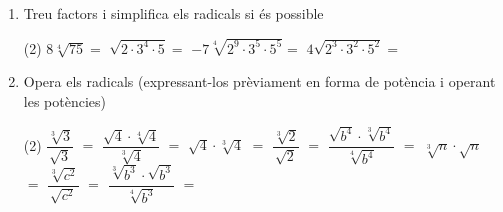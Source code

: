 \documentclass[a4paper]{article}
\begin{document}
\begin{enumerate}[resume]
  
      \item Treu factors i simplifica els radicals si és possible
      \begin{tasks}(2)
        \task $8  \sqrt[4]{75}={}$
        \task $ \sqrt{2 \cdot 3^{4} \cdot 5}={}$
        \task $-7  \sqrt[4]{2^{9} \cdot 3^{5} \cdot 5^{5}}={}$
        \task $4  \sqrt{2^{3} \cdot 3^{2} \cdot 5^{2}}={}$
      \end{tasks}
      \item Opera els radicals (expressant-los prèviament en forma de potència i operant les potències)
      \begin{tasks}(2)
        \task $\dfrac{ \sqrt[3]{3} }{  \sqrt{3}}$ $={}$
        \task $\dfrac{ \sqrt{4} \cdot  \sqrt[4]{4}}{ \sqrt[3]{4}}$ $={}$
        \task $ \sqrt{4} \cdot  \sqrt[3]{4}$ $={}$
        \task $\dfrac{ \sqrt[3]{2} }{  \sqrt{2}}$ $={}$
        \task $\dfrac{ \sqrt{b^{4}} \cdot  \sqrt[3]{b^{4}}}{ \sqrt[4]{b^{4}}}$ $={}$
        \task $ \sqrt[3]{n} \cdot  \sqrt{n}$ $={}$
        \task $\dfrac{ \sqrt[3]{c^{2}} }{  \sqrt{c^{2}}}$ $={}$
        \task $\dfrac{ \sqrt[3]{b^{3}} \cdot  \sqrt{b^{3}}}{ \sqrt[4]{b^{3}}}$ $={}$
      \end{tasks}
       \end{enumerate}
  
\end{document}
